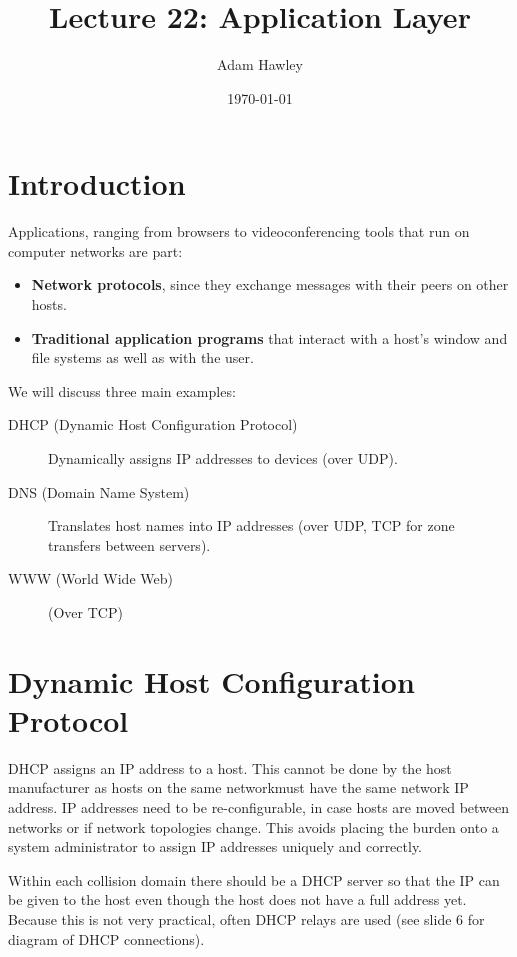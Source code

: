 \documentclass[11pt]{article}
\author{Adam Hawley}
\date{\today}
\title{Lecture 22: Application Layer}
\begin{document}
\maketitle
\tableofcontents


\section{Introduction}
\label{sec:orgbfa55ca}
Applications, ranging from browsers to videoconferencing tools that run on computer networks are part:
\begin{itemize}
\item \textbf{Network protocols}, since they exchange messages with their peers on other hosts.
\item \textbf{Traditional application programs} that interact with a host's window and file systems as well as with the user.
\end{itemize}
We will discuss three main examples:
\begin{description}
\item[{DHCP (Dynamic Host Configuration Protocol)}] Dynamically assigns IP addresses to devices (over UDP).
\item[{DNS (Domain Name System)}] Translates host names into IP addresses (over UDP, TCP for zone transfers between servers).
\item[{WWW (World Wide Web)}] (Over TCP)
\end{description}

\section{Dynamic Host Configuration Protocol}
\label{sec:org206e1ec}
DHCP assigns an IP address to a host.
This cannot be done by the host manufacturer as hosts on the same networkmust have the same network IP address.
IP addresses need to be re-configurable, in case hosts are moved between networks or if network topologies change.
This avoids placing the burden onto a system administrator to assign IP addresses uniquely and correctly.

Within each collision domain there should be a DHCP server so that the IP can be given to the host even though the host does not have a full address yet.
Because this is not very practical, often DHCP relays are used (see slide 6 for diagram of DHCP connections).
\end{document}
